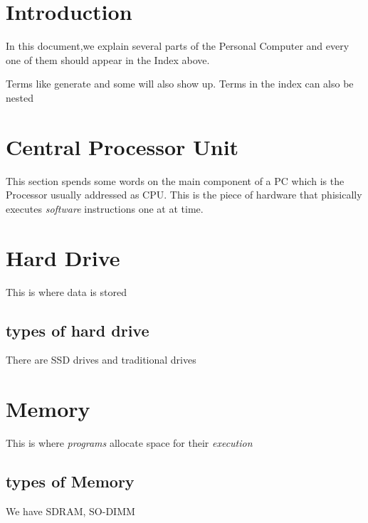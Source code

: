 \documentclass[a4paper,12pt]{article}
\begin{document}
\tableofcontents

\section{Introduction}
In this document,we explain several parts  of the Personal Computer
and every one of them should appear in the Index above.

Terms like generate and some 
will also show up. Terms in the index can also be 
nested 

\clearpage

\section{Central Processor Unit}
This section spends some words on the main component of a PC 
which is the Processor usually addressed as CPU.
This is the piece of hardware that phisically executes \emph{software} instructions one at at time.




\clearpage

\section{Hard Drive}
This is where data is stored
\subsection{types of hard drive}
There are SSD drives and traditional drives
\clearpage

\section{Memory}

This is where \emph{programs} allocate space for their \emph{execution}

\subsection{types of Memory}

We have SDRAM, SO-DIMM
\printindex
\end{document}
